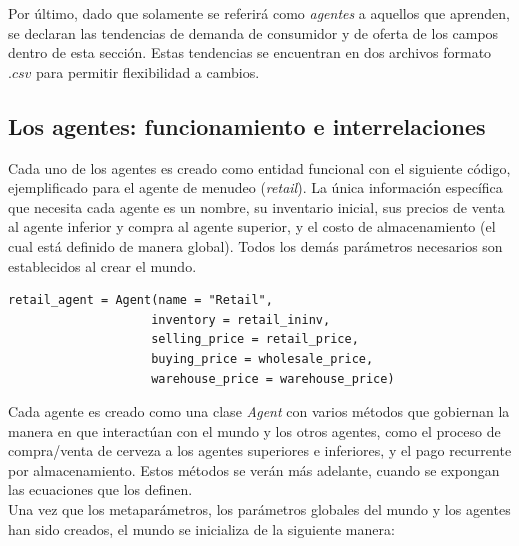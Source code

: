 Por \'ultimo, dado que solamente se referir\'a como \textit{agentes} a aquellos que aprenden, se declaran las tendencias de demanda de consumidor y de oferta de los campos dentro de esta secci\'on. Estas tendencias se encuentran en dos archivos formato $.csv$ para permitir flexibilidad a cambios.

\subsection{Los agentes: funcionamiento e interrelaciones}

Cada uno de los agentes es creado como entidad funcional con el siguiente c\'odigo, ejemplificado para el agente de menudeo (\textit{retail}). La \'unica informaci\'on espec\'ifica que necesita cada agente es un nombre, su inventario inicial, sus precios de venta al agente inferior y compra al agente superior, y el costo de almacenamiento (el cual est\'a definido de manera global). Todos los dem\'as par\'ametros necesarios son establecidos al crear el mundo.

\begin{verbatim}
retail_agent = Agent(name = "Retail", 
                    inventory = retail_ininv,
                    selling_price = retail_price,
                    buying_price = wholesale_price,
                    warehouse_price = warehouse_price)

\end{verbatim}

Cada agente es creado como una clase \textit{Agent} con varios m\'etodos que gobiernan la manera en que interact\'uan con el mundo y los otros agentes, como el proceso de compra/venta de cerveza a los agentes superiores e inferiores, y el pago recurrente por almacenamiento. Estos m\'etodos se ver\'an m\'as adelante, cuando se expongan las ecuaciones que los definen.\\

Una vez que los metapar\'ametros, los par\'ametros globales del mundo y los agentes han sido creados, el mundo se inicializa de la siguiente manera:

